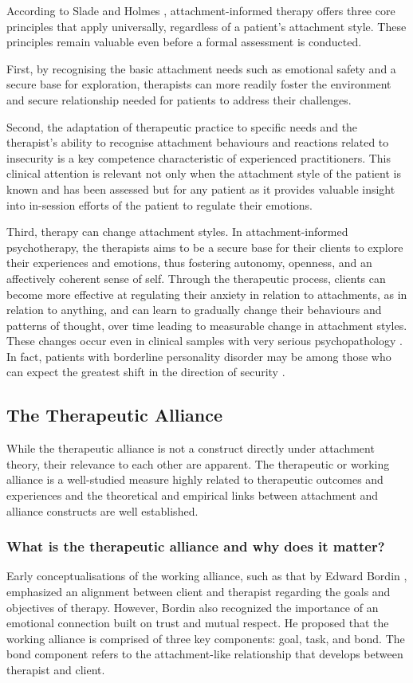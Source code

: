 \documentclass[12pt]{report}
\begin{document}
According to Slade and Holmes \citeyear{Slade2019}, attachment-informed therapy offers three core principles that apply universally, regardless of a patient's attachment style.
These principles remain valuable even before a formal assessment is conducted.

First, by recognising the basic attachment needs such as emotional safety and a secure base for exploration, therapists can more readily foster the environment and secure relationship needed for patients to address their challenges.

Second, the adaptation of therapeutic practice to specific needs and the therapist's ability to recognise attachment behaviours and reactions related to insecurity is a key competence characteristic of experienced practitioners. This clinical attention is relevant not only when the attachment style of the patient is known and has been assessed but for any patient as it provides valuable insight into in-session efforts of the patient to regulate their emotions.

Third, therapy can change attachment styles. In attachment-informed psychotherapy, the therapists aims to be a secure base for their clients to explore their experiences and emotions, thus fostering autonomy, openness, and an affectively coherent sense of self.
Through the therapeutic process, clients can become more effective at regulating their anxiety in relation to attachments, as in relation to anything, and can learn to gradually change their behaviours and patterns of thought, over time leading to measurable change in attachment styles.
These changes occur even in clinical samples with very serious psychopathology \cite{Fonagy1996}.
In fact, patients with borderline personality disorder may be among those who can expect the greatest shift in the direction of security \cite{Levy2006, Stovall2003}.

\subsection{The Therapeutic Alliance}
While the therapeutic alliance is not a construct directly under attachment theory, their relevance to each other are apparent. The therapeutic or working alliance is a well-studied measure highly related to therapeutic outcomes and experiences and the theoretical and empirical links between attachment and alliance constructs are well established.

\subsubsection*{What is the therapeutic alliance and why does it matter?}
Early conceptualisations of the working alliance, such as that by Edward Bordin \citeyear{Bordin1979}, emphasized an alignment between client and therapist regarding the goals and objectives of therapy. However, Bordin also recognized the importance of an emotional connection built on trust and mutual respect. He proposed that the working alliance is comprised of three key components: goal, task, and bond. The bond component refers to the attachment-like relationship that develops between therapist and client.
\end{document}
